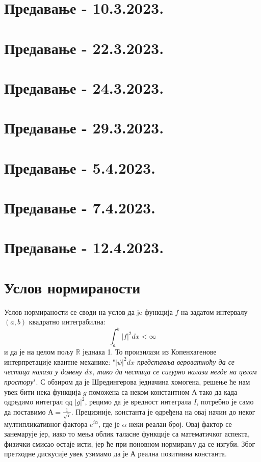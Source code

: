 \documentclass{tufte-handout} %
\theoremstyle{definition}
\theoremstyle{remark}
\newcommand{\R}{\mathbb{R}}
\begin{document}
\section{Предавање - 10.3.2023.}
\section{Предавање - 22.3.2023.}
\section{Предавање - 24.3.2023.}
\section{Предавање - 29.3.2023.}
\section{Предавање - 5.4.2023.}
\section{Предавање - 7.4.2023.}
\section{Предавање - 12.4.2023.}





\appendix
\section{Услов нормираности}\label{sec:uslov_normiranosti}
Услов нормираности се своди на услов да je функција $f$ на задатом интервалу $(a,b)$ квадратно интеграбилна: \begin{equation*}
	\int_{a}^{b}|f|^2dx<\infty
\end{equation*}
и да је на целом пољу $\R$ једнака 1. То произилази из Копенхагенове интерпретације квантне механике: "\textit{$|\psi|^2dx$ представља вероватноћу да се честица налази у домену $dx$, тако да честица се сигурно налази негде на целом простору}". 
С обзиром да је Шредингерова једначина хомогена, решење ће нам увек бити нека функција $g$ поможена са неком константном $А$ тако да када одредимо интеграл од $|g|^2$, рецимо да је вредност интеграла $I$, потребно је само да поставимо $А=\frac{1}{\sqrt{I}}$. Прецизније, константа је одређена на овај начин до неког мултипликативног фактора $e^{i\alpha}$, где је $\alpha$ неки реалан број. Овај фактор се занемарује јер, иако то мења облик таласне функције са математичког аспекта, физички смисао остаје исти, јер ће при поновном нормирању да се изгуби. Због претходне дискусије увек узимамо да је $А$ реална позитивна константа.
\end{document}
